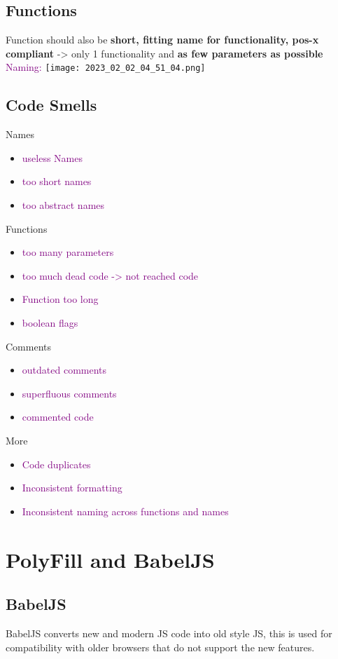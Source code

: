 \documentclass[main.tex,fontsize=6pt,paper=a4,paper=landscape,DIV=calc,]{scrartcl}
\begin{document}
\begin{multicols*}{4}
\subsection{Functions}  
Function should also be \textbf{short, fitting name for functionality, pos-x compliant} -> only 1 functionality and \textbf{as few parameters as possible}
\textcolor{purple}{Naming:}\newline
\texttt{[image: 2023\_02\_02\_04\_51\_04.png]}

\subsection{Code Smells}  
Names
\begin{itemize}
\item \textcolor{purple}{useless Names}
\item \textcolor{purple}{too short names}
\item \textcolor{purple}{too abstract names}
\end{itemize}
Functions
\begin{itemize}
\item \textcolor{purple}{too many parameters}
\item \textcolor{purple}{too much dead code -> not reached code}
\item \textcolor{purple}{Function too long}
\item \textcolor{purple}{boolean flags}
\end{itemize} 
Comments
\begin{itemize}
\item \textcolor{purple}{outdated comments}
\item \textcolor{purple}{superfluous comments}
\item \textcolor{purple}{commented code}
\end{itemize} 
More
\begin{itemize}
\item \textcolor{purple}{Code duplicates}
\item \textcolor{purple}{Inconsistent formatting}
\item \textcolor{purple}{Inconsistent naming across functions and names}
\end{itemize}


\section{PolyFill and BabelJS}

\subsection{BabelJS}  
BabelJS converts new and modern JS code into old style JS, this is used for compatibility with older browsers that do not support the new features.


\end{multicols*}
\end{document}
